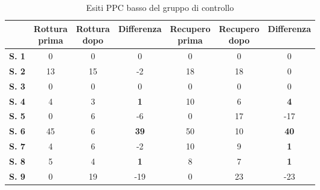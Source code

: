 \begin{table}[H]
\begin{center}
\begin{tabular}{|c|c|c|c|c|c|c|} \hline
{\textbf{}} & \pbox{20cm}{\textbf{Rottura} \\ \textbf{prima}} & \pbox{20cm}{\textbf{Rottura} \\ \textbf{dopo}} & \textbf{Differenza} & \pbox{20cm}{\textbf{Recupero} \\ \textbf{prima}} & \pbox{20cm}{\textbf{Recupero} \\ \textbf{dopo}} & \textbf{Differenza} \\ \hline
\textbf{S. 1} & 0 & 0 & 0 & 0 & 0 & 0 \\ \hline
\textbf{S. 2} & 13 & 15 & -2 & 18 & 18 & 0 \\ \hline
\textbf{S. 3} & 0 & 0 & 0 & 0 & 0 & 0 \\ \hline
\textbf{S. 4} & 4 & 3 & \textbf{1} & 10 & 6 & \textbf{4} \\ \hline
\textbf{S. 5} & 0 & 6 & -6 & 0 & 17 & -17 \\ \hline
\textbf{S. 6} & 45 & 6 & \textbf{39} & 50 & 10 & \textbf{40}  \\ \hline
\textbf{S. 7} & 4 & 6 & -2 & 10 & 9 & \textbf{1} \\ \hline
\textbf{S. 8} & 5 & 4 & \textbf{1} & 8 & 7 & \textbf{1} \\ \hline
\textbf{S. 9} & 0 & 19 & -19 & 0 & 23 & -23 \\ \hline
\end{tabular}
\end{center}
\caption{Esiti PPC basso del gruppo di controllo}
\end{table}

\\\ \\\  

